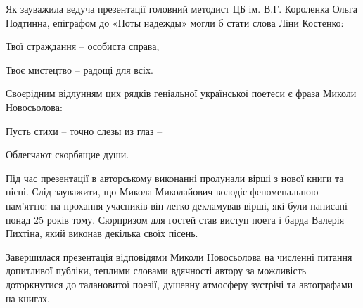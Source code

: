 Як зауважила ведуча презентації головний методист ЦБ ім. В.Г. Короленка Ольга
Подтинна, епіграфом до «Ноты надежды» могли б стати слова Ліни Костенко:

Твої страждання – особиста справа,

Твоє мистецтво – радощі для всіх.

Своєрідним відлунням цих рядків геніальної української поетеси є фраза Миколи
Новосьолова:

Пусть стихи – точно слезы из глаз –

Облегчают скорбящие души.

Під час презентації в авторському виконанні пролунали вірші з нової книги та
пісні. Слід зауважити, що Микола Миколайович володіє феноменальною пам'яттю: на
прохання учасників він легко декламував вірші, які були написані понад 25 років
тому. Сюрпризом для гостей став виступ поета і барда Валерія Пихтіна, який
виконав декілька своїх пісень.

Завершилася презентація відповідями Миколи Новосьолова на численні питання
допитливої публіки, теплими словами вдячності автору за можливість
доторкнутися до талановитої поезії, душевну атмосферу зустрічі та автографами
на книгах.
